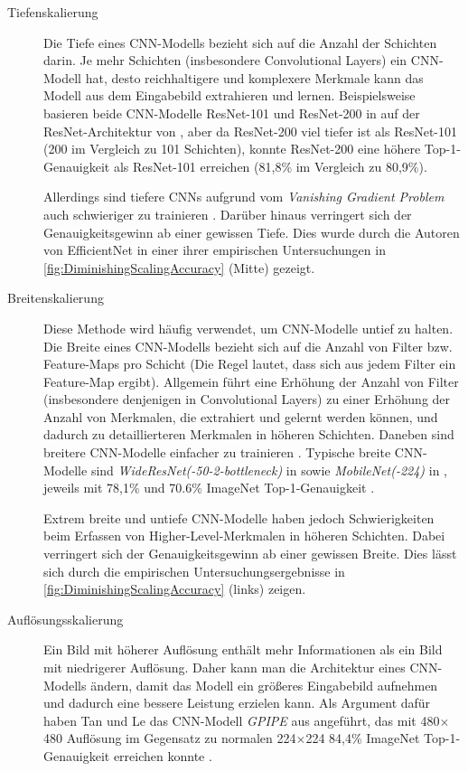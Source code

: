 \begin{description}
	\item[Tiefenskalierung] Die Tiefe eines CNN-Modells bezieht sich auf die Anzahl der Schichten darin. Je mehr Schichten (insbesondere Convolutional Layers) ein CNN-Modell hat, desto reichhaltigere und komplexere Merkmale kann das Modell aus dem Eingabebild extrahieren und lernen. Beispielsweise basieren beide CNN-Modelle ResNet-101 und ResNet-200 in \cite{cui2021parametric} auf der ResNet-Architektur von \cite{he2015deep}, aber da ResNet-200 viel tiefer ist als ResNet-101 (200 im Vergleich zu 101 Schichten), konnte ResNet-200 eine höhere Top-1-Genauigkeit als ResNet-101 erreichen (81,8\% im Vergleich zu 80,9\%).
	
	Allerdings sind tiefere CNNs aufgrund vom \emph{Vanishing Gradient Problem} auch schwieriger zu trainieren \cite{zagoruyko2017wide}. Darüber hinaus verringert sich der Genauigkeitsgewinn ab einer gewissen Tiefe. Dies wurde durch die Autoren von EfficientNet in einer ihrer empirischen Untersuchungen in \autoref{fig:DiminishingScalingAccuracy} (Mitte) gezeigt.
	
	\item[Breitenskalierung] Diese Methode wird häufig verwendet, um CNN-Modelle untief zu halten. Die Breite eines CNN-Modells bezieht sich auf die Anzahl von Filter bzw. Feature-Maps pro Schicht (Die Regel lautet, dass sich aus jedem Filter ein Feature-Map ergibt). Allgemein führt eine Erhöhung der Anzahl von Filter (insbesondere denjenigen in Convolutional Layers) zu einer Erhöhung der Anzahl von Merkmalen, die extrahiert und gelernt werden können, und dadurch zu detaillierteren Merkmalen in höheren Schichten. Daneben sind breitere CNN-Modelle einfacher zu trainieren \cite{zagoruyko2017wide}. Typische breite CNN-Modelle sind \emph{WideResNet(-50-2-bottleneck)} in \cite{zagoruyko2017wide} sowie \emph{MobileNet(-224)} in \cite{howard2017mobilenets}, jeweils mit 78,1\% und 70.6\% ImageNet Top-1-Genauigkeit \cite{PapersWithCode-ImageNet}.
	
	Extrem breite und untiefe CNN-Modelle haben jedoch Schwierigkeiten beim Erfassen von Higher-Level-Merkmalen in höheren Schichten. Dabei verringert sich der Genauigkeitsgewinn ab einer gewissen Breite. Dies lässt sich durch die empirischen Untersuchungsergebnisse in \autoref{fig:DiminishingScalingAccuracy} (links) zeigen.
	
	\item[Auflösungsskalierung] Ein Bild mit höherer Auflösung enthält mehr Informationen als ein Bild mit niedrigerer Auflösung. Daher kann man die Architektur eines CNN-Modells ändern, damit das Modell ein größeres Eingabebild aufnehmen und dadurch eine bessere Leistung erzielen kann.
	Als Argument dafür haben Tan und Le das CNN-Modell \emph{GPIPE} aus \cite{huang2019gpipe} angeführt, das mit 480$\times$480 Auflösung im Gegensatz zu normalen 224$\times$224 84,4\% ImageNet Top-1-Genauigkeit erreichen konnte \cite{PapersWithCode-ImageNet}.
	

\end{description}
